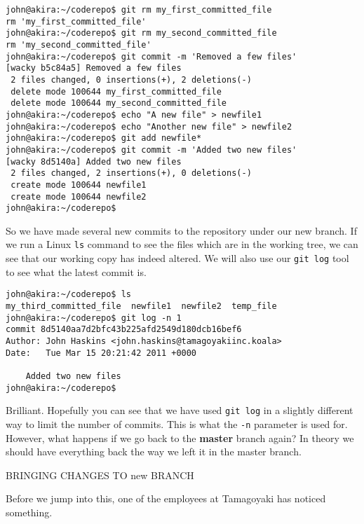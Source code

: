 \begin{Verbatim}[frame=leftline,framerule=1mm,fontsize=\relsize{-3}] 
john@akira:~/coderepo$ git rm my_first_committed_file
rm 'my_first_committed_file'
john@akira:~/coderepo$ git rm my_second_committed_file
rm 'my_second_committed_file'
john@akira:~/coderepo$ git commit -m 'Removed a few files'
[wacky b5c84a5] Removed a few files
 2 files changed, 0 insertions(+), 2 deletions(-)
 delete mode 100644 my_first_committed_file
 delete mode 100644 my_second_committed_file
john@akira:~/coderepo$ echo "A new file" > newfile1
john@akira:~/coderepo$ echo "Another new file" > newfile2
john@akira:~/coderepo$ git add newfile*
john@akira:~/coderepo$ git commit -m 'Added two new files'
[wacky 8d5140a] Added two new files
 2 files changed, 2 insertions(+), 0 deletions(-)
 create mode 100644 newfile1
 create mode 100644 newfile2
john@akira:~/coderepo$ 
\end{Verbatim}

So we have made several new commits to the repository under our new branch.  If we run a Linux \texttt{ls} command to see the files which are in the working tree, we can see that our working copy has indeed altered.  We will also use our \texttt{git log} tool to see what the latest commit is.

\begin{Verbatim}[frame=leftline,framerule=1mm,fontsize=\relsize{-3}] 
john@akira:~/coderepo$ ls
my_third_committed_file  newfile1  newfile2  temp_file
john@akira:~/coderepo$ git log -n 1
commit 8d5140aa7d2bfc43b225afd2549d180dcb16bef6
Author: John Haskins <john.haskins@tamagoyakiinc.koala>
Date:   Tue Mar 15 20:21:42 2011 +0000

    Added two new files
john@akira:~/coderepo$ 
\end{Verbatim}

Brilliant.  Hopefully you can see that we have used \texttt{git log} in a slightly different way to limit the number of commits.  This is what the \texttt{-n} parameter is used for.  However, what happens if we go back to the \textbf{master} branch again?  In theory we should have everything back the way we left it in the master branch.

BRINGING CHANGES TO new BRANCH

Before we jump into this, one of the employees at Tamagoyaki has noticed something.

